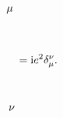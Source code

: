 \begin{equation}
\begin{gathered}
\begin{tikzpicture}[x=0.75pt,y=0.75pt,yscale=-1,xscale=1]
        \draw (98,120.6) node [anchor=south east] [inner sep=0.75pt]    {$\mu $};
        \draw (100,231.4) node [anchor=north east] [inner sep=0.75pt]    {$\nu $};
        \end{tikzpicture}
    \end{gathered} = \ii e^2 \delta_{\mu}^\nu.
\end{equation}